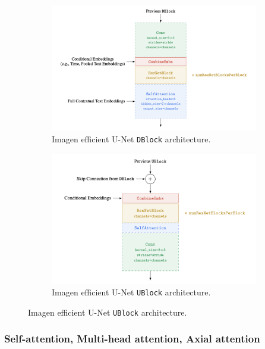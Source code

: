 \begin{figure}
    \centering
    \begin{subfigure}[b]{0.5\textwidth}   
        \centering 
        \includegraphics[width=\textwidth]{images/appendix/imagen/dblock.png}
        \caption[]%
        {{\small Imagen efficient U-Net \texttt{DBlock} architecture.}}
    \end{subfigure}
    \hfill
    \begin{subfigure}[b]{0.475\textwidth}
        \centering
        \includegraphics[width=\textwidth]{images/appendix/imagen/ublock.png}
        \caption[]%
        {{\small Imagen efficient U-Net \texttt{UBlock} architecture.}}
    \end{subfigure}
\end{figure}




\subsubsection{Self-attention, Multi-head attention, Axial attention}

